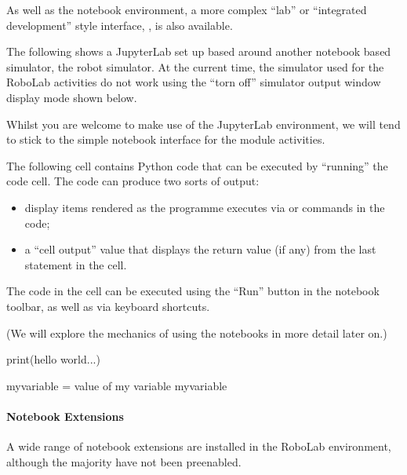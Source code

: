 \documentclass[letterpaper,10pt,english]{sphinxmanual}
\let\sphinxpxdimen\pdfpxdimen\else\newdimen\sphinxpxdimen
\begin{document}
As well as the notebook environment, a more complex “lab” or “integrated development” style interface, , is also available.

The following shows a JupyterLab set up based around another notebook based simulator, the  robot simulator. At the current time, the simulator used for the RoboLab activities do not work using the “torn off” simulator output window display mode shown below.

\sphinxincludegraphics[width=2648\sphinxpxdimen,height=1416\sphinxpxdimen]{{00_01_jupyterlab_example}.png}

Whilst you are welcome to make use of the JupyterLab environment, we will tend to stick to the simple notebook interface for the module activities.

The following cell contains Python code that can be executed by “running” the code cell. The code can produce two sorts of output:
\begin{itemize}
\item {} 
display items rendered as the programme executes via  or  commands in the code;

\item {} 
a “cell output” value that displays the return value (if any) from the last statement in the cell.

\end{itemize}

The code in the cell can be executed using the “Run” button in the notebook toolbar, as well as via keyboard shortcuts.

(We will explore the mechanics of using the notebooks in more detail later on.)

{
\begin{sphinxVerbatim}[commandchars=\\\{\}]
\llap{\color{nbsphinxin}[ ]:\,\hspace{\fboxrule}\hspace{\fboxsep}}print(\PYGZdq{}hello world...\PYGZdq{})

my\PYGZus{}variable = \PYGZdq{}value of my variable\PYGZdq{}
my\PYGZus{}variable
\end{sphinxVerbatim}
}


\paragraph{Notebook Extensions}
\label{\detokenize{content/00_SOFTWARE_GUIDE/Section_00_01_Jupyter_environment:Notebook-Extensions}}
A wide range of notebook extensions are installed in the RoboLab environment, although the majority have not been pre\sphinxhyphen{}enabled.
\end{document}
